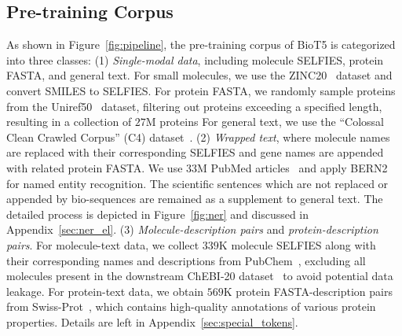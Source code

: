 \documentclass[11pt]{article}
\newcommand{\method}{{BioT5}}
\begin{document}
\subsection{Pre-training Corpus}
As shown in Figure~\ref{fig:pipeline}, the pre-training corpus of \method{} is categorized into three classes:
(1) {\em Single-modal data}, including molecule SELFIES, protein FASTA, and general text.
For small molecules, we use the ZINC20~\citep{irwin2020zinc20} dataset and convert SMILES to SELFIES.
For protein FASTA, we randomly sample proteins from the Uniref50~\citep{suzek2007uniref} dataset, filtering out proteins exceeding a specified length, resulting in a collection of $27$M proteins
For general text, we use the ``Colossal Clean Crawled Corpus'' (C4) dataset~\citep{raffel2020exploring}.
(2) {\em Wrapped text}, where molecule names are replaced with their corresponding SELFIES and gene names are appended with related protein FASTA. 
We use $33$M PubMed articles~\citep{canese2013pubmed} and apply BERN2~\citep{sung2022bern2} for named entity recognition.
The scientific sentences which are not replaced or appended by bio-sequences are remained as a supplement to general text.
The detailed process is depicted in Figure~\ref{fig:ner} and discussed in Appendix~\ref{sec:ner_el}.
(3) {\em Molecule-description pairs} and {\em protein-description pairs}.
For molecule-text data, we collect $339$K molecule SELFIES along with their corresponding names and descriptions from PubChem~\citep{kim2019pug}, excluding all molecules present in the downstream ChEBI-20 dataset~\citep{DBLP:conf/emnlp/EdwardsLRHCJ22} to avoid potential data leakage.
For protein-text data, we obtain $569$K protein FASTA-description pairs from Swiss-Prot~\citep{boutet2007uniprotkb}, which contains high-quality annotations of various protein properties. 
Details are left in Appendix~\ref{sec:special_tokens}.
\end{document}
